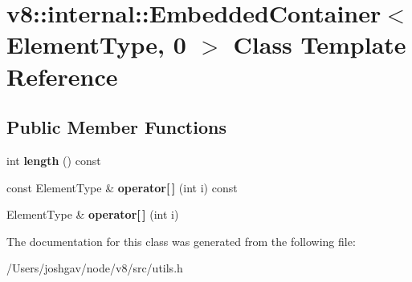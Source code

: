 \hypertarget{classv8_1_1internal_1_1_embedded_container_3_01_element_type_00_010_01_4}{}\section{v8\+:\+:internal\+:\+:Embedded\+Container$<$ Element\+Type, 0 $>$ Class Template Reference}
\label{classv8_1_1internal_1_1_embedded_container_3_01_element_type_00_010_01_4}
\subsection*{Public Member Functions}
\begin{DoxyCompactItemize}
\item 
int {\bfseries length} () const \hypertarget{classv8_1_1internal_1_1_embedded_container_3_01_element_type_00_010_01_4_acd6978a5a99d0930017c275addf3474c}{}\label{classv8_1_1internal_1_1_embedded_container_3_01_element_type_00_010_01_4_acd6978a5a99d0930017c275addf3474c}

\item 
const Element\+Type \& {\bfseries operator\mbox{[}$\,$\mbox{]}} (int i) const \hypertarget{classv8_1_1internal_1_1_embedded_container_3_01_element_type_00_010_01_4_a8c61a28e064c368ff83540db79b2252f}{}\label{classv8_1_1internal_1_1_embedded_container_3_01_element_type_00_010_01_4_a8c61a28e064c368ff83540db79b2252f}

\item 
Element\+Type \& {\bfseries operator\mbox{[}$\,$\mbox{]}} (int i)\hypertarget{classv8_1_1internal_1_1_embedded_container_3_01_element_type_00_010_01_4_a2e68b4ec3f24b76990d72948a30e110f}{}\label{classv8_1_1internal_1_1_embedded_container_3_01_element_type_00_010_01_4_a2e68b4ec3f24b76990d72948a30e110f}

\end{DoxyCompactItemize}


The documentation for this class was generated from the following file\+:\begin{DoxyCompactItemize}
\item 
/\+Users/joshgav/node/v8/src/utils.\+h\end{DoxyCompactItemize}
